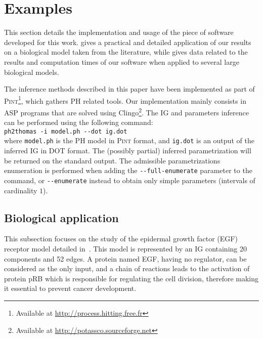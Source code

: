 \section{Examples}\label{sec:examples}

This section details the implementation and usage of the piece of software developed for this work.
 gives a practical and detailed application of our results on a biological model taken from the literature,
while  gives data related to the results and computation times of our software when applied to several large biological models.

\medskip

The inference methods described in this paper have been implemented as part of
\textsc{Pint}\footnote{Available at \url{http://process.hitting.free.fr}}, which gathers PH related tools.
Our implementation mainly consists in ASP programs that are solved using
Clingo\footnote{Available at \url{http://potassco.sourceforge.net}}.
The IG and parameters inference can be performed using the following command:\\
  \hspace*{1.2em}\texttt{ph2thomas -i model.ph -{}-dot ig.dot}\\
where \texttt{model.ph} is the PH model in \textsc{Pint} format,
and \texttt{ig.dot} is an output of the inferred IG in DOT format.
The (possibly partial) inferred parametrization will be returned on the standard output.
The admissible parametrizations enumeration is performed when adding the \texttt{-{}-full-enumerate} parameter to the command,
or \texttt{-{}-enumerate} instead to obtain only simple parameters (intervals of cardinality $1$).



\subsection{Biological application}\label{ssec:appli}

This subsection focuses on the study of the epidermal growth factor (EGF) receptor model detailed in~\cite{Sahin09}.
This model is represented by an IG containing 20 components and 52 edges.
A protein named EGF, having no regulator, can be considered as the only input,
and a chain of reactions leads to the activation of protein pRB which is responsible for regulating the cell division,
therefore making it essential to prevent cancer development.

